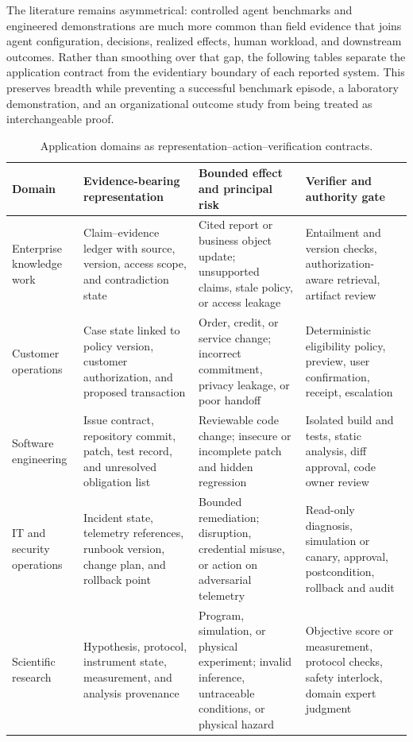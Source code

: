 The literature remains asymmetrical: controlled agent benchmarks and engineered demonstrations are much more common than field evidence that joins agent configuration, decisions, realized effects, human workload, and downstream outcomes. Rather than smoothing over that gap, the following tables separate the application contract from the evidentiary boundary of each reported system. This preserves breadth while preventing a successful benchmark episode, a laboratory demonstration, and an organizational outcome study from being treated as interchangeable proof.

\begin{table}[!htbp]
\centering
\caption{Application domains as representation--action--verification contracts.}
\label{tab:applications}
\small
\surveytableformat
\begin{tabularx}{\textwidth}{L{2.45cm}Y Y Y}
\toprule
{}\textbf{Domain} & \textbf{Evidence-bearing representation} & \textbf{Bounded effect and principal risk} & \textbf{Verifier and authority gate} \\
\midrule
Enterprise knowledge work & Claim--evidence ledger with source, version, access scope, and contradiction state & Cited report or business object update; unsupported claims, stale policy, or access leakage & Entailment and version checks, authorization-aware retrieval, artifact review \\
Customer operations & Case state linked to policy version, customer authorization, and proposed transaction & Order, credit, or service change; incorrect commitment, privacy leakage, or poor handoff & Deterministic eligibility policy, preview, user confirmation, receipt, escalation \\
Software engineering & Issue contract, repository commit, patch, test record, and unresolved obligation list & Reviewable code change; insecure or incomplete patch and hidden regression & Isolated build and tests, static analysis, diff approval, code owner review \\
IT and security operations & Incident state, telemetry references, runbook version, change plan, and rollback point & Bounded remediation; disruption, credential misuse, or action on adversarial telemetry & Read-only diagnosis, simulation or canary, approval, postcondition, rollback and audit \\
Scientific research & Hypothesis, protocol, instrument state, measurement, and analysis provenance & Program, simulation, or physical experiment; invalid inference, untraceable conditions, or physical hazard & Objective score or measurement, protocol checks, safety interlock, domain expert judgment \\

\end{tabularx}
\end{table}
